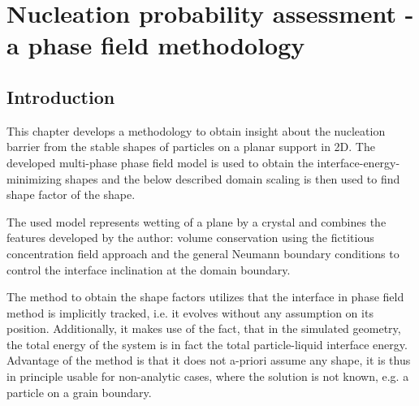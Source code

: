 \chapter{Nucleation probability assessment - a phase field methodology}
\section{Introduction}
This chapter develops a methodology to obtain insight about the nucleation barrier from the stable shapes of particles on a planar support in 2D. The developed multi-phase phase field model is used to obtain the interface-energy-minimizing shapes and the below described domain scaling is then used to find shape factor of the shape. 

The used model represents wetting of a plane by a crystal and combines the features developed by the author: volume conservation using the fictitious concentration field approach and the general Neumann boundary conditions to control the interface inclination at the domain boundary. 

The method to obtain the shape factors utilizes that the interface in phase field method is implicitly tracked, i.e. it evolves without any assumption on its position. Additionally, it makes use of the fact, that in the simulated geometry, the total energy of the system is in fact the total particle-liquid interface energy. Advantage of the method is that it does not a-priori assume any shape, it is thus in principle usable for non-analytic cases, where the solution is not known, e.g. a particle on a grain boundary.

%

